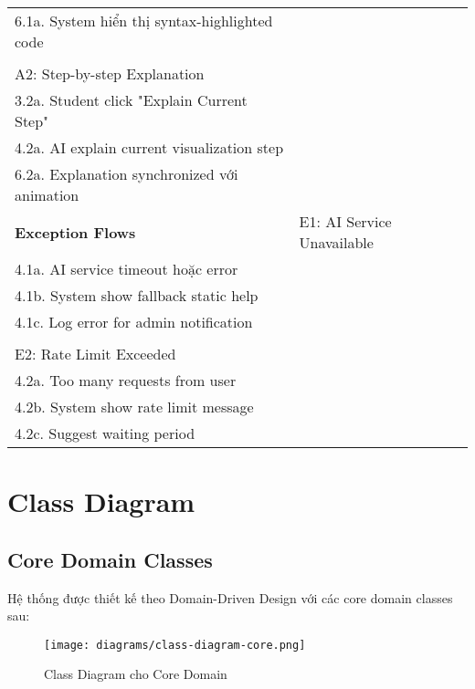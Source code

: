 \begin{table}[H]
\begin{tabularx}{\textwidth}{|l|X|}
\hspace{0.5cm} 6.1a. System hiển thị syntax-highlighted code \\
\\
A2: Step-by-step Explanation \\
\hspace{0.5cm} 3.2a. Student click "Explain Current Step" \\
\hspace{0.5cm} 4.2a. AI explain current visualization step \\
\hspace{0.5cm} 6.2a. Explanation synchronized với animation \\ \hline
\textbf{Exception Flows} & 
E1: AI Service Unavailable \\
\hspace{0.5cm} 4.1a. AI service timeout hoặc error \\
\hspace{0.5cm} 4.1b. System show fallback static help \\
\hspace{0.5cm} 4.1c. Log error for admin notification \\
\\
E2: Rate Limit Exceeded \\
\hspace{0.5cm} 4.2a. Too many requests from user \\
\hspace{0.5cm} 4.2b. System show rate limit message \\
\hspace{0.5cm} 4.2c. Suggest waiting period \\ \hline
\end{tabularx}
\end{table}

\section{Class Diagram}
\label{sec:class-diagram}

\subsection{Core Domain Classes}
\label{subsec:core-classes}

Hệ thống được thiết kế theo Domain-Driven Design với các core domain classes sau:

\begin{figure}[H]
\centering
\texttt{[image: diagrams/class-diagram-core.png]}
\caption{Class Diagram cho Core Domain}
\label{fig:class-core}
\end{figure}


